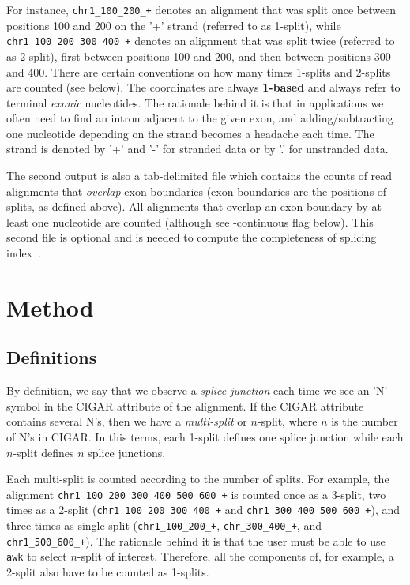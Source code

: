 \documentclass{article}
\begin{document}
For instance, {\tt chr1\_100\_200\_+} denotes an alignment that was split once between positions 100 and 200 on the '+' 
strand (referred to as 1-split), while {\tt chr1\_100\_200\_300\_400\_+} denotes an alignment that was split twice 
(referred to as 2-split), first between positions 100 and 200, and then between positions 300 and 400. There are certain 
conventions on how many times 1-splits and 2-splits are counted (see below). The coordinates are always {\bf 1-based} 
and always refer to terminal {\em exonic} nucleotides. The rationale behind it is that in applications we often need to
find an intron adjacent to the given exon, and adding/subtracting one nucleotide depending on the strand becomes a headache 
each time. The strand is denoted by '+' and '-' for stranded data or by '.' for unstranded data.

The second output is also a tab-delimited file which contains the counts of read alignments that {\em overlap} exon 
boundaries (exon boundaries are the positions of splits, as defined above). All alignments that overlap an exon boundary 
by at least one nucleotide are counted (although see -continuous flag below). This second file is optional and is needed 
to compute the completeness of splicing index~\cite{pmid23172860, pmid22955974}.

\section{Method}
\subsection{Definitions}
By definition, we say that we observe a {\em splice junction} each time we see an 'N' symbol in the CIGAR attribute 
of the alignment. If the CIGAR attribute contains several N's, then we have a {\em multi-split} or $n$-split, where $n$ 
is the number of N's in CIGAR. In this terms, each 1-split defines one splice junction while each $n$-split defines
$n$ splice junctions. 

Each multi-split is counted according to the number of splits. For example, the 
alignment {\tt chr1\_100\_200\_300\_400\_500\_600\_+} is counted once as a 3-split, two times 
as a 2-split ({\tt chr1\_100\_200\_300\_400\_+} and {\tt chr1\_300\_400\_500\_600\_+}), and three times 
as single-split ({\tt chr1\_100\_200\_+}, {\tt chr\_300\_400\_+}, and {\tt chr1\_500\_600\_+}). The rationale behind 
it is that the user must be able to use {\tt awk} to select $n$-split of interest. Therefore, all the components of,
for example, a 2-split also have to be counted as 1-splits.
\end{document}
